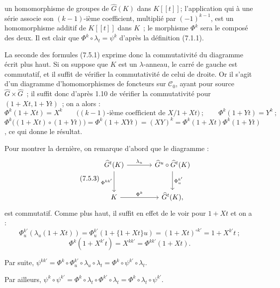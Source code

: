 un homomorphisme de groupes de \(\widehat G(K)\) dans \(K[[t]]\); l'application qui à une série associe son \((k-1)\)-ième coefficient, multiplié par \((-1)^{k-1}\), est un homomorphisme additif de \(K[[t]]\) dans \(K\)~; le morphisme \(\Phi^k\) sera le composé des deux. Il est clair que \(\Phi^k\circ\lambda_t=\psi^k\) d'après la définition (7.1.1).

La seconde des formules (7.5.1) exprime donc la commutativité du diagramme écrit plus haut. Si on suppose que \(K\) est un \(\lambda\)-anneau, le carré de gauche est commutatif, et il suffit de vérifier la commutativité de celui de droite. Or il s'agit d'un diagramme d'homomorphismes de foncteurs sur \(\mathcal C_0\), ayant pour source \(\widehat G\times\widehat G\)~; il suffit donc d'après 1.10 de vérifier la commutativité pour \((1+Xt,1+Yt)\)~; on a alors :
\[
  \Phi^k(1+Xt)=X^k\qquad\bigl(\text{$(k-1)$-ième coefficient de }X/1+Xt\bigr)~;\qquad
  \Phi^k(1+Yt)=Y^k~;
\]
\(\Phi^k\bigl((1+Xt)\circ(1+Yt)\bigr)=\Phi^k(1+XYt)=(XY)^k=\Phi^k(1+Xt)\Phi^k(1+Yt)\), ce qui donne le résultat.

Pour montrer la dernière, on remarque d'abord que le diagramme :
\begin{equation}\tag{7.5.3}
\begin{tikzcd}[column sep=large,row sep=large]
\widehat G^t(K) \arrow[r,"\lambda_u"] \arrow[d,"\Phi^{kk'}"'] &
\widehat G^u\circ\widehat G^t(K) \arrow[d,"\Phi^{k'}_u"]\\
K \arrow[r,"\Phi^k"] &
\widehat G^t(K),
\end{tikzcd}
\end{equation}
est commutatif. Comme plus haut, il suffit en effet de le voir pour \(1+Xt\) et on a :
\[
  \Phi^{k'}_u(\lambda_u(1+Xt))
  =
  \Phi^{k'}_u(1+\{1+Xt\}u)
  =
  (1+Xt)^{\circ k'}
  =
  1+X^{k'}t~;
\]
\[
  \Phi^k(1+X^{k'}t)=X^{kk'}=\Phi^{kk'}(1+Xt).
\]

Par suite, \(\psi^{kk'}=\Phi^k\circ\Phi^{k'}_u\circ\lambda_u\circ\lambda_t=\Phi^k\circ\psi^{k'}\circ\lambda_t\).

Par ailleurs, \(\psi^k\circ\psi^{k'}=\Phi^k\circ\lambda_t\circ\Phi^{k'}\circ\lambda_t=\Phi^k\circ\lambda_t\circ\psi^{k'}\).
